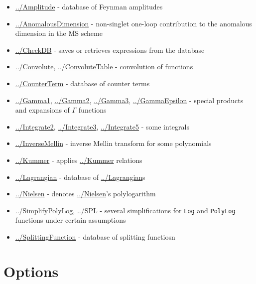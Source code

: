 \documentclass[../FeynCalcManual.tex]{subfiles}
\begin{document}
\begin{itemize}
\tightlist
\item
  \hyperlink{../amplitude}{../Amplitude} - database of Feynman
  amplitudes
\item
  \hyperlink{../anomalousdimension}{../AnomalousDimension} - non-singlet
  one-loop contribution to the anomalous dimension in the
  \(\overline{{\textrm{MS}}}\) scheme
\item
  \hyperlink{../checkdb}{../CheckDB} - saves or retrieves expressions
  from the database
\item
  \hyperlink{../convolute}{../Convolute},
  \hyperlink{../convolutetable}{../ConvoluteTable} - convolution of
  functions
\item
  \hyperlink{../counterterm}{../CounterTerm} - database of counter terms
\item
  \hyperlink{../gamma1}{../Gamma1}, \hyperlink{../gamma2}{../Gamma2},
  \hyperlink{../gamma3}{../Gamma3},
  \hyperlink{../gammaepsilon}{../GammaEpsilon} - special products and
  expansions of \(\Gamma\) functions
\item
  \hyperlink{../integrate2}{../Integrate2},
  \hyperlink{../integrate3}{../Integrate3},
  \hyperlink{../integrate5}{../Integrate5} - some integrals
\item
  \hyperlink{../inversemellin}{../InverseMellin} - inverse Mellin
  transform for some polynomials
\item
  \hyperlink{../kummer}{../Kummer} - applies
  \hyperlink{../kummer}{../Kummer} relations
\item
  \hyperlink{../lagrangian}{../Lagrangian} - database of
  \hyperlink{../lagrangian}{../Lagrangian}s
\item
  \hyperlink{../nielsen}{../Nielsen} - denotes
  \hyperlink{../nielsen}{../Nielsen}'s polylogarithm
\item
  \hyperlink{../simplifypolylog}{../SimplifyPolyLog},
  \hyperlink{../spl}{../SPL} - several simplifications for \texttt{Log}
  and \texttt{PolyLog} functions under certain assumptions
\item
  \hyperlink{../splittingfunction}{../SplittingFunction} - database of
  splitting functiosn
\end{itemize}

\hypertarget{options}{
\section{Options}\label{options}}
\end{document}
